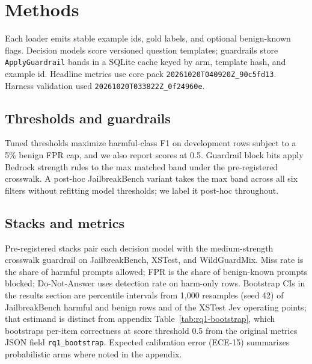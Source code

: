 \section{Methods}
\label{sec:methods}

Each loader emits stable example ids, gold labels, and optional benign-known flags.
Decision models score versioned question templates; guardrails store \texttt{ApplyGuardrail} bands in a SQLite cache keyed by arm, template hash, and example id.
Headline metrics use core pack \texttt{20261020T040920Z\_\allowbreak 90c5fd13}.
Harness validation used \texttt{20261020T033822Z\_\allowbreak 0f24960e}.

\subsection{Thresholds and guardrails}
Tuned thresholds maximize harmful-class F1 on development rows subject to a 5\% benign FPR cap, and we also report scores at 0.5.
Guardrail block bits apply Bedrock strength rules to the max matched band under the pre-registered crosswalk.
A post-hoc JailbreakBench variant takes the max band across all six filters without refitting model thresholds; we label it post-hoc throughout.

\subsection{Stacks and metrics}
Pre-registered stacks pair each decision model with the medium-strength crosswalk guardrail on JailbreakBench, XSTest, and WildGuardMix.
Miss rate is the share of harmful prompts allowed; FPR is the share of benign-known prompts blocked; Do-Not-Answer uses detection rate on harm-only rows.
Bootstrap CIs in the results section are percentile intervals from 1{,}000 resamples (seed 42) of JailbreakBench harmful and benign rows and of the XSTest Jev operating points; that estimand is distinct from appendix Table~\ref{tab:rq1-bootstrap}, which bootstraps per-item correctness at score threshold 0.5 from the original metrics JSON field \texttt{rq1\_bootstrap}.
Expected calibration error (ECE-15) summarizes probabilistic arms where noted in the appendix.
